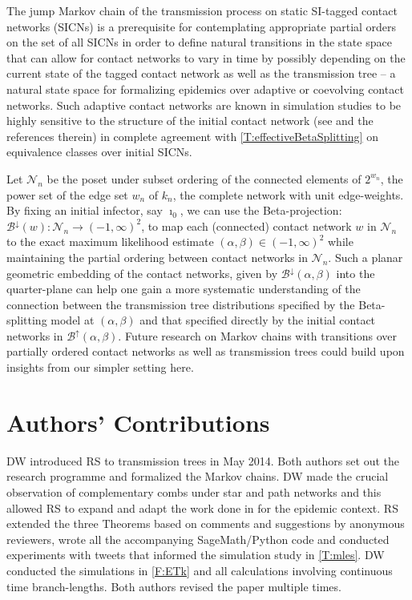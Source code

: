 \documentclass[review]{elsarticle}
\numberwithin{equation}{section}
\let\orgautoref\autoref
\renewcommand{\autoref}
        {\def\equationautorefname{Eq.}%
         \def\figureautorefname{Fig.}%
         \def\subfigureautorefname{Fig.}%
         \def\sectionautorefname{Sect.}%
         \def\subsectionautorefname{Sect.}%
         \def\subsubsectionautorefname{Sect.}%
         \def\Itemautorefname{item}%
         \def\tableautorefname{Table}%
         \def\propositionautorefname{Prop.}%
         \def\corollaryautorefname{Corollary}%
         \def\theoremautorefname{Theorem}%
         \def\remarkautorefname{Remark}%
         \def\lemmaautorefname{Lemma}%
         \def\proofofautorefname{Proof}%
         \def\exampleautorefname{Example}%
         \orgautoref}
\begin{document}
The jump Markov chain of the transmission process on static SI-tagged contact networks (SICNs) is a prerequisite for contemplating appropriate partial orders on the set of all SICNs in order to define natural transitions in the state space that can allow for contact networks to vary in time by possibly depending on the current state of the tagged contact network as well as the transmission tree -- a natural state space for formalizing epidemics over adaptive or coevolving contact networks.  
Such adaptive contact networks are known in simulation studies to be highly sensitive to the structure of the initial contact network (see \cite[VII.B.7]{pastor2015} and the references therein) in complete agreement with \autoref{T:effectiveBetaSplitting} on equivalence classes over initial SICNs.  

Let $\mathcal{N}_n$ be the poset under subset ordering of the connected elements of $2^{w_n}$, the power set of the edge set $w_n$ of $k_n$, the complete network with unit edge-weights.  
By fixing an initial infector, say $\imath_0$, we can use the Beta-projection: $\mathcal{B}^{\downarrow}(w): \mathcal{N}_n \to (-1,\infty)^2$, to map each (connected) contact network $w$ in $\mathcal{N}_n$ to the exact maximum likelihood estimate $(\alpha,\beta) \in (-1,\infty)^2$ while maintaining the partial ordering between contact networks in $\mathcal{N}_n$.  
Such a planar geometric embedding of the contact networks, given by $\mathcal{B}^{\downarrow}(\alpha,\beta)$ into the quarter-plane can help one gain a more systematic understanding of the connection between the transmission tree distributions specified by the Beta-splitting model at $(\alpha,\beta)$ and that specified directly by the initial contact networks in $\mathcal{B}^{\uparrow}(\alpha,\beta)$.  
Future research on Markov chains with transitions over partially ordered contact networks as well as transmission trees could build upon insights from our simpler setting here. 

\section*{Authors' Contributions}
DW introduced RS to transmission trees in May 2014. Both authors set out the research programme and formalized the Markov chains.  
DW made the crucial observation of complementary combs under star and path networks and this allowed RS to expand and adapt the work done in \cite{SainudiinVeber2016} for the epidemic context.  RS extended the three Theorems based on comments and suggestions by anonymous reviewers, wrote all the accompanying SageMath/Python code and conducted experiments with tweets that informed the simulation study in \autoref{T:mles}. DW conducted the simulations in \autoref{F:ETk} and all calculations involving continuous time branch-lengths.  Both authors revised the paper multiple times.
\end{document}
